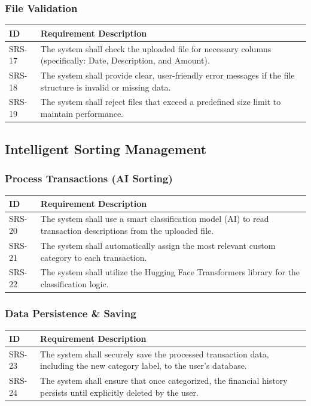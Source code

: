 \documentclass[11pt,a4paper]{report}
\begin{document}
\subsubsection{File Validation}
\begin{longtable}{|p{2.5cm}|p{12cm}|}
	\hline
	\textbf{ID} & \textbf{Requirement Description} \\
	\hline
	SRS-17 & The system shall check the uploaded file for necessary columns (specifically: Date, Description, and Amount). \\ \hline
	SRS-18 & The system shall provide clear, user-friendly error messages if the file structure is invalid or missing data. \\ \hline
	SRS-19 & The system shall reject files that exceed a predefined size limit to maintain performance. \\ \hline
\end{longtable}

\subsection{Intelligent Sorting Management}

\subsubsection{Process Transactions (AI Sorting)}
\begin{longtable}{|p{2.5cm}|p{12cm}|}
	\hline
	\textbf{ID} & \textbf{Requirement Description} \\
	\hline
	SRS-20 & The system shall use a smart classification model (AI) to read transaction descriptions from the uploaded file. \\ \hline
	SRS-21 & The system shall automatically assign the most relevant custom category to each transaction. \\ \hline
	SRS-22 & The system shall utilize the Hugging Face Transformers library for the classification logic. \\ \hline
\end{longtable}

\subsubsection{Data Persistence \& Saving}
\begin{longtable}{|p{2.5cm}|p{12cm}|}
	\hline
	\textbf{ID} & \textbf{Requirement Description} \\
	\hline
	SRS-23 & The system shall securely save the processed transaction data, including the new category label, to the user's database. \\ \hline
	SRS-24 & The system shall ensure that once categorized, the financial history persists until explicitly deleted by the user. \\ \hline
\end{longtable}
\end{document}
